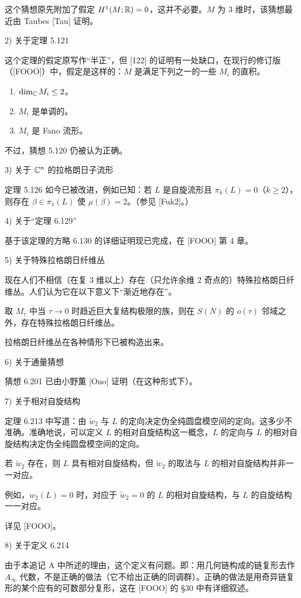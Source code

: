 这个猜想原先附加了假定 $H^1(M;\mathbb{R})=0$，这并不必要。$M$ 为 3 维时，该猜想最近由 Taubes [Tau] 证明。

2) 关于定理 5.121

这个定理的假定原写作“半正”，但 [122] 的证明有一处缺口，在现行的修订版（[FOOO]）中，假定是这样的：$M$ 是满足下列之一的一些 $M_i$ 的直积。
\begin{enumerate}[label=（\arabic*）,leftmargin=2.4em]
  \item $\dim_{\mathbb{C}} M_i\le2$。
  \item $M_i$ 是单调的。
  \item $M_i$ 是 Fano 流形。
\end{enumerate}
不过，猜想 5.120 仍被认为正确。

3) 关于 $\mathbb{C}^n$ 的拉格朗日子流形

定理 5.126 如今已被改进，例如已知：若 $L$ 是自旋流形且 $\pi_k(L)=0$（$k\ge2$），则存在 $\beta\in\pi_1(L)$ 使 $\mu(\beta)=2$。（参见 [Fuk2]。）

4) 关于“定理 6.129”

基于该定理的方略 6.130 的详细证明现已完成，在 [FOOO] 第 4 章。

5) 关于特殊拉格朗日纤维丛

现在人们不相信（在复 3 维以上）存在（只允许余维 2 奇点的）特殊拉格朗日纤维丛。人们认为它在以下意义下“渐近地存在”。

取 $M_\tau$ 中当 $\tau\to0$ 时趋近巨大复结构极限的族，则在 $S(N)$ 的 $o(\tau)$ 邻域之外，存在特殊拉格朗日纤维丛。

拉格朗日纤维丛在各种情形下已被构造出来。

6) 关于通量猜想

猜想 6.201 已由小野薫 [Ono] 证明（在这种形式下）。

7) 关于相对自旋结构

定理 6.213 中写道：由 $\tilde w_2$ 与 $L$ 的定向决定伪全纯圆盘模空间的定向。这多少不准确。准确地说，可以定义 $L$ 的相对自旋结构这一概念，$L$ 的定向与 $L$ 的相对自旋结构决定伪全纯圆盘模空间的定向。

若 $\tilde w_2$ 存在，则 $L$ 具有相对自旋结构，但 $\tilde w_2$ 的取法与 $L$ 的相对自旋结构并非一一对应。

例如，$w_2(L)=0$ 时，对应于 $\tilde w_2=0$ 的 $L$ 的相对自旋结构，与 $L$ 的自旋结构一一对应。

详见 [FOOO]。

8) 关于定义 6.214

由于本追记 A 中所述的理由，这个定义有问题。即：用几何链构成的链复形去作 $A_\infty$ 代数，不是正确的做法（它不给出正确的同调群）。正确的做法是用奇异链复形的某个应有的可数部分复形，这在 [FOOO] 的 §30 中有详细叙述。

